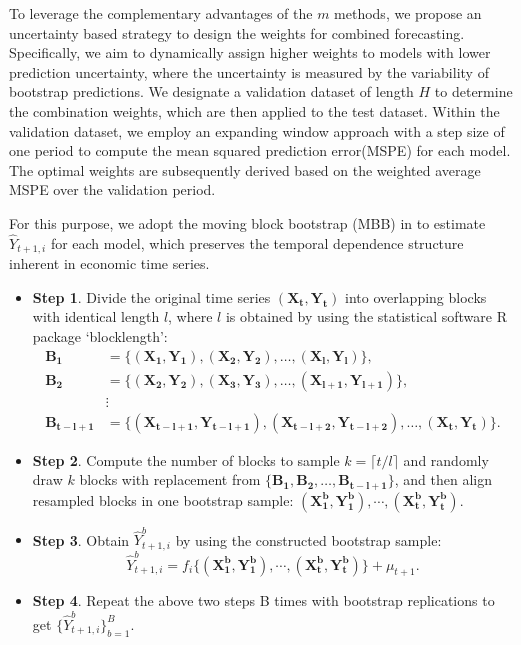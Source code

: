 \documentclass[12pt]{article}
\begin{document}
To leverage the complementary advantages of the $m$ methods, we propose an uncertainty based strategy to design the weights for combined forecasting. Specifically, we aim to dynamically assign higher weights to models with lower prediction uncertainty, where the uncertainty is measured by the variability of bootstrap predictions. We designate a validation dataset of length $H$ to determine the combination weights, which are then applied to the test dataset. Within the validation dataset, we employ an expanding window approach with a step size of one period to compute the mean squared prediction error(MSPE) for each model. The optimal weights are subsequently derived based on the weighted average MSPE over the validation period.
  

For this purpose, we adopt the moving block bootstrap (MBB) in \cite{kunsch1989jackknife} to estimate $\hat{Y}_{t+1, i}$ for each model, which preserves the temporal dependence structure inherent in economic time series.

\begin{itemize}
  \item  \textbf{Step 1}. Divide the original time series $(\bm{X_t},\bm{Y_t})$ into overlapping blocks with identical length $l$, where $l$ is obtained by using the statistical software R package `blocklength':
    \[
      \begin{aligned}
        \bm{B_1} &= \{(\bm{X_1}, \bm{Y_1}), (\bm{X_2}, \bm{Y_2}), \dots, (\bm{X_l}, \bm{Y_l})\}, \\
        \bm{B_2} &= \{(\bm{X_2}, \bm{Y_2}), (\bm{X_3}, \bm{Y_3}), \dots, (\bm{X_{l+1}}, \bm{Y_{l+1}})\}, \\
        &\vdots \\
        \bm{B_{t-l+1}} &= \{(\bm{X_{t-l+1}}, \bm{Y_{t-l+1}}), (\bm{X_{t-l+2}}, \bm{Y_{t-l+2}}), \dots, (\bm{X_t}, \bm{Y_t})\}.
      \end{aligned}
    \]
    
  \item \textbf{Step 2}. Compute the number of blocks to sample \( k = \lceil t / l \rceil \) and randomly draw \( k \) blocks with replacement from \( \{\bm{B_1}, \bm{B_2}, \dots, \bm{B_{t-l+1}}\} \), and then align resampled blocks in one bootstrap sample: \( (\bm{X_1^b}, \bm{Y_1^b}), \cdots, (\bm{X_{t}^b}, \bm{Y_t^b}) \).

  \item \textbf{Step 3}. Obtain $\hat{Y}_{t+1,i}^b$ by using the constructed bootstrap sample:
     \[
      \hat{Y}_{t+1, i}^b = f_i\{(\bm{X_1^b}, \bm{Y_1^b}), \cdots, (\bm{X_{t}^b}, \bm{Y_t^b})\} + \mu_{t+1}.
    \]

     \item \textbf{Step 4}. Repeat the above two steps B times with bootstrap replications to get  $\{\hat{Y}_{t+1, i}^b\}_{b=1}^B$.
\end{itemize}
\end{document}
